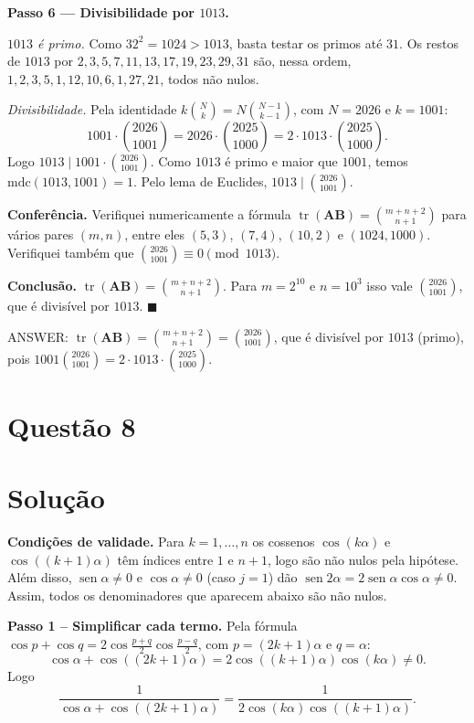 \documentclass{article}%
\begin{document}
\textbf{Passo 6 --- Divisibilidade por $1013$.}

\emph{$1013$ é primo.} Como $32^2=1024>1013$, basta testar os primos até $31$. Os restos de $1013$ por $2,3,5,7,11,13,17,19,23,29,31$ são, nessa ordem, $1,2,3,5,1,12,10,6,1,27,21$, todos não nulos.

\emph{Divisibilidade.} Pela identidade $k\binom{N}{k}=N\binom{N-1}{k-1}$, com $N=2026$ e $k=1001$:
\[
1001\cdot\binom{2026}{1001}=2026\cdot\binom{2025}{1000}=2\cdot 1013\cdot\binom{2025}{1000}.
\]
Logo $1013\mid 1001\cdot\binom{2026}{1001}$. Como $1013$ é primo e maior que $1001$, temos $\mathrm{mdc}(1013,1001)=1$. Pelo lema de Euclides, $1013\mid\binom{2026}{1001}$.

\textbf{Conferência.} Verifiquei numericamente a fórmula $\operatorname{tr}(\mathbf{A}\mathbf{B})=\binom{m+n+2}{n+1}$ para vários pares $(m,n)$, entre eles $(5,3)$, $(7,4)$, $(10,2)$ e $(1024,1000)$. Verifiquei também que $\binom{2026}{1001}\equiv 0 \pmod{1013}$.

\textbf{Conclusão.} $\operatorname{tr}(\mathbf{A}\mathbf{B})=\binom{m+n+2}{n+1}$. Para $m=2^{10}$ e $n=10^3$ isso vale $\binom{2026}{1001}$, que é divisível por $1013$. $\blacksquare$

ANSWER: $\operatorname{tr}(\mathbf{A}\mathbf{B})=\binom{m+n+2}{n+1}=\binom{2026}{1001}$, que é divisível por $1013$ (primo), pois $1001\binom{2026}{1001}=2\cdot1013\cdot\binom{2025}{1000}$.%
\newpage%
\section*{Questão 8}

\section*{Solução}

\textbf{Condições de validade.} Para $k=1,\dots,n$ os cossenos $\cos(k\alpha)$ e $\cos((k+1)\alpha)$ têm índices entre $1$ e $n+1$, logo são não nulos pela hipótese. Além disso, $\operatorname{sen}\alpha\neq0$ e $\cos\alpha\neq 0$ (caso $j=1$) dão $\operatorname{sen}2\alpha=2\operatorname{sen}\alpha\cos\alpha\neq 0$. Assim, todos os denominadores que aparecem abaixo são não nulos.

\textbf{Passo 1 -- Simplificar cada termo.} Pela fórmula $\cos p+\cos q=2\cos\frac{p+q}{2}\cos\frac{p-q}{2}$, com $p=(2k+1)\alpha$ e $q=\alpha$:
\[
\cos\alpha+\cos((2k+1)\alpha)=2\cos((k+1)\alpha)\cos(k\alpha)\neq 0 .
\]
Logo
\[
\frac{1}{\cos\alpha+\cos((2k+1)\alpha)}=\frac{1}{2\cos(k\alpha)\cos((k+1)\alpha)} .
\]
\end{document}
